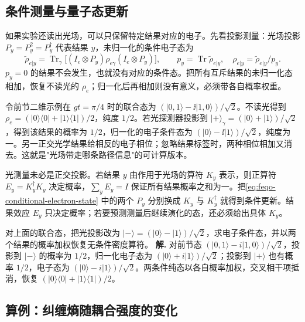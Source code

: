 \subsection{条件测量与量子态更新}

如果实验还读出光场，可以只保留特定结果对应的电子。先看投影测量：光场投影 \(P_y=P_y^2=P_y^\dagger\) 代表结果 \(y\)，未归一化的条件电子态为
\begin{equation}
\widetilde\rho_{e|y}=\operatorname{Tr}_\gamma
\bigl[(I_e\otimes P_y)\rho_{e\gamma}(I_e\otimes P_y)\bigr],\qquad
p_y=\operatorname{Tr}\widetilde\rho_{e|y},\quad
\rho_{e|y}=\widetilde\rho_{e|y}/p_y.
\label{eq:feqo-conditional-electron-state}
\end{equation}
\(p_y=0\) 的结果不会发生，也就没有对应的条件态。把所有互斥结果的未归一化态相加，恢复不读光的 \(\rho_e\)；归一化后再相加则没有意义，必须带各自概率权重。

令前节二维示例在 \(gt=\pi/4\) 时的联合态为 \((|0,1\rangle-\ii|1,0\rangle)/\sqrt2\)。不读光得到 \(\rho_e=(|0\rangle\langle0|+|1\rangle\langle1|)/2\)，纯度 \(1/2\)。若光探测器投影到 \(|+\rangle_\gamma=(|0\rangle+|1\rangle)/\sqrt2\)，得到该结果的概率为 \(1/2\)，归一化的电子条件态为 \((|0\rangle-\ii|1\rangle)/\sqrt2\)，纯度为一。另一正交光学结果给相反的电子相位；忽略结果标签时，两种相位相加又消去。这就是"光场带走哪条路径信息"的可计算版本。

光测量未必是正交投影。若结果 \(y\) 由作用于光场的算符 \(K_y\) 表示，则正算符 \(E_y=K_y^\dagger K_y\) 决定概率，\(\sum_yE_y=I\) 保证所有结果概率之和为一。把\cref{eq:feqo-conditional-electron-state} 中的两个 \(P_y\) 分别换成 \(K_y\) 与 \(K_y^\dagger\) 就得到条件更新。结果效应 \(E_y\) 只决定概率；若要预测测量后继续演化的态，还必须给出具体 \(K_y\)。


\par
\begin{workedexample}
对上面的联合态，把光投影改为 \(|-\rangle=(|0\rangle-|1\rangle)/\sqrt2\)，求电子条件态，并以两个结果的概率加权恢复无条件密度算符。
\textbf{解.} 对前节态 \((|0,1\rangle-i|1,0\rangle)/\sqrt2\)，投影到 \(|-\rangle\) 的概率为 \(1/2\)，归一化电子态为 \((|0\rangle+i|1\rangle)/\sqrt2\)；投影到 \(|+\rangle\) 也有概率 \(1/2\)，电子态为 \((|0\rangle-i|1\rangle)/\sqrt2\)。两条件纯态以各自概率加权，交叉相干项抵消，恢复 \((|0\rangle\langle0|+|1\rangle\langle1|)/2\)。
\end{workedexample}
\par
\subsection{算例：纠缠熵随耦合强度的变化}

